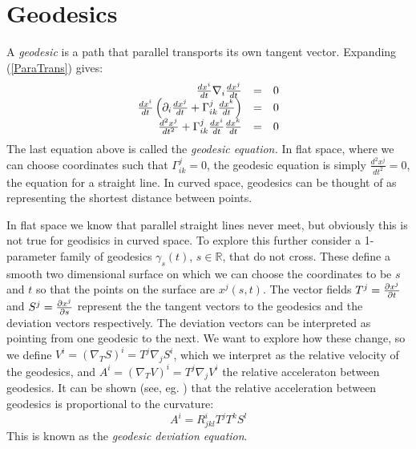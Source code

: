 \section{Geodesics}
A \textit{geodesic} is a path that parallel transports its own tangent vector. Expanding (\ref{ParaTrans}) gives:
\begin{equation}\label{geoEq}
\begin{array}{rcl}
\frac{dx^i}{dt}\nabla_i \frac{dx^j}{dt}&=&0 \\
\frac{dx^i}{dt}\left({\partial}_i \frac{dx^j}{dt} + \Gamma^j_{ik}\frac{dx^k}{dt} \right)&=&0 \\
\frac{d^2x^j}{dt^2} + \Gamma^j_{ik}\frac{dx^i}{dt} \frac{dx^k}{dt}&=&0
\end{array}
\end{equation}
The last equation above is called the \textit{geodesic equation.} In flat space, where we can choose coordinates such that $\Gamma^j_{ik}=0$, the geodesic equation is simply $\frac{d^2x^j}{dt^2}=0$, the equation for a straight line. In curved space, geodesics can be thought of as representing the shortest distance between points. 

In flat space we know that parallel straight lines never meet, but obviously this is not true for geodisics in curved space. To explore this further consider a 1-parameter family of geodesics $\gamma_s(t)$, $s \in \mathbb{R}$, that do not cross. These define a smooth two dimensional surface on which we can choose the coordinates to be $s$ and $t$ so that the points on the surface are $x^j (s,t)$. The vector fields $T^j = \frac{{\partial} x^j}{{\partial} t}$ and $S^j = \frac{{\partial} x^j}{{\partial} s}$ represent the the tangent vectors to the geodesics and the deviation vectors respectively. The deviation vectors can be interpreted as pointing from one geodesic to the next. We want to explore how these change, so we define $V^i = (\nabla_T S)^i = T^j \nabla_j S^i$, which we interpret as the relative velocity of the geodesics, and $A^i = (\nabla_T V)^i = T^j \nabla_j V^i$ the relative acceleraton between geodesics. It can be shown (see, eg. \cite{Carroll}) that the relative acceleration between geodesics is proportional to the curvature:
\begin{equation}\label{GeoDevEq}
A^i = R^i_{jkl}T^j T^k S^l
\end{equation}
This is known as the \textit{geodesic deviation equation}. 



